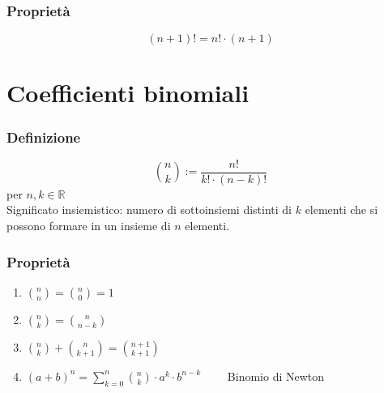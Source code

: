 \documentclass[a4paper]{article}
\begin{document}
\subsubsection*{Proprietà}
\[(n + 1)! = n! \cdot (n + 1)\]
\vspace{15pt}

\section{Coefficienti binomiali}
\subsubsection*{Definizione}
\[\binom{n}{k} := \frac{n!}{k! \cdot (n - k)!}\]
per \(n, k \in \mathbb{R}\) \\
Significato insiemistico: numero di sottoinsiemi distinti di \(k\) elementi che si possono formare
in un insieme di \(n\) elementi.

\subsubsection*{Proprietà}
\begin{enumerate}
	\item \(\displaystyle \binom{n}{n} = \binom{n}{0} = 1\)
	\item \(\displaystyle \binom{n}{k} = \binom{n}{n-k}\)
	\item \(\displaystyle \binom{n}{k} + \binom{n}{k+1} = \binom{n+1}{k+1}\)
	\item \(\displaystyle (a + b) ^ n = \sum_{k = 0} ^ {n} \binom{n}{k} \cdot a ^ k \cdot b ^ {n - k} \qquad\) Binomio di Newton
\end{enumerate}

\newpage
\end{document}
